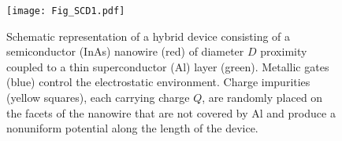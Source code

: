 \documentclass[aps,prmaterials,twocolumn,superscriptaddress,longbibliography]{revtex4-2}
\begin{document}
\begin{figure}[t]
    \begin{center}
    \texttt{[image: Fig\_SCD1.pdf]}
    \end{center}
    \vspace{-0.5cm}
    \caption{Schematic representation of a hybrid device consisting of a semiconductor (InAs) nanowire (red) of diameter $D$ proximity coupled to a thin superconductor (Al) layer (green). Metallic gates (blue) control the electrostatic environment. Charge impurities (yellow squares), each carrying charge $Q$, are randomly placed on the facets of the nanowire that are not covered by Al and produce a nonuniform potential along the length of the device.}
    \label{FIG_SCD1}
    \vspace{-1mm}
\end{figure}
\end{document}

